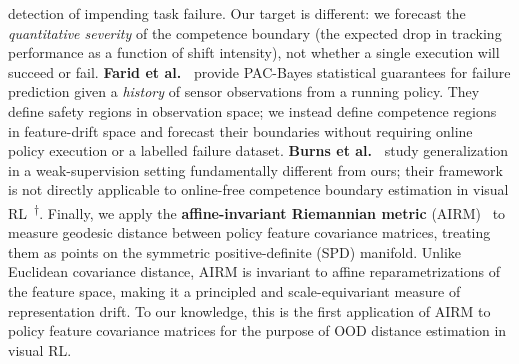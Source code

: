 detection of impending task failure.
Our target is different: we forecast the \emph{quantitative severity} of the
competence boundary (the expected drop in tracking performance as a function
of shift intensity), not whether a single execution will succeed or fail.
%
\textbf{Farid et al.~\cite{farid2022failure}} provide PAC-Bayes statistical
guarantees for failure prediction given a \emph{history} of sensor observations
from a running policy.
They define safety regions in observation space; we instead define competence
regions in feature-drift space and forecast their boundaries without requiring
online policy execution or a labelled failure dataset.
%
\textbf{Burns et al.~\cite{burns2023weak}} study generalization in a
weak-supervision setting fundamentally different from ours; their framework
is not directly applicable to online-free competence boundary estimation in
visual RL~\textsuperscript{$\dagger$}.
%
Finally, we apply the \textbf{affine-invariant Riemannian metric}
(AIRM)~\cite{moakher2005differential} to measure geodesic distance between
policy feature covariance matrices, treating them as points on the symmetric
positive-definite (SPD) manifold.
Unlike Euclidean covariance distance, AIRM is invariant to affine
reparametrizations of the feature space, making it a principled and
scale-equivariant measure of representation drift.
To our knowledge, this is the first application of AIRM to policy feature
covariance matrices for the purpose of OOD distance estimation in visual RL.
